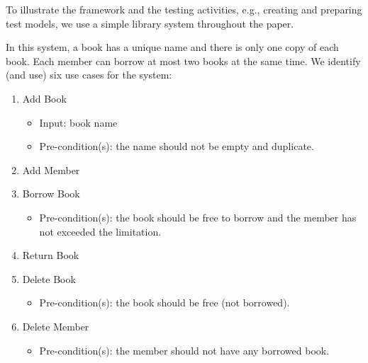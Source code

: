 %
%
\label{sec:running-example}
To illustrate the framework and the testing activities, e.g., creating and preparing test models, we use a simple library system throughout the paper. 

In this system, a book has a unique name and there is only one copy of each book. Each member can borrow at most two books at the same time. We identify (and use) six use cases for the system:
\begin{enumerate}
	\item Add Book 
	\begin{itemize}
		\item  Input: book name
		\item Pre-condition(s): the name should not be empty and duplicate.
	\end{itemize}

	\item Add Member
	
	\item Borrow Book
	\begin{itemize}
		\item Pre-condition(s): the book should be free to borrow and the member has not exceeded the limitation.
	\end{itemize}

	\item Return Book
	
	\item Delete Book
	\begin{itemize}
		\item Pre-condition(s): the book should be free (not borrowed).
	\end{itemize}

	\item Delete Member
	\begin{itemize}
		\item Pre-condition(s): the member should not have any borrowed book.
	\end{itemize}
\end{enumerate}
